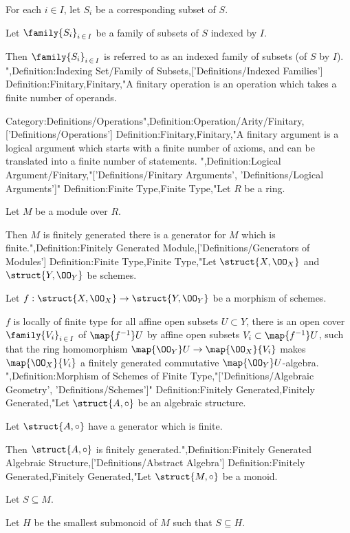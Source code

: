 For each $i \in I$, let $S_i$ be a corresponding subset of $S$.

Let $\family {S_i}_{i \mathop \in I}$ be a family of subsets of $S$ indexed by $I$.


Then $\family {S_i}_{i \mathop \in I}$ is referred to as an indexed family of subsets (of $S$ by $I$).
",Definition:Indexing Set/Family of Subsets,['Definitions/Indexed Families']
Definition:Finitary,Finitary,"A finitary operation is an operation which takes a finite number of operands.


Category:Definitions/Operations",Definition:Operation/Arity/Finitary,['Definitions/Operations']
Definition:Finitary,Finitary,"A finitary argument is a logical argument which starts with a finite number of axioms, and can be translated into a finite number of statements.
",Definition:Logical Argument/Finitary,"['Definitions/Finitary Arguments', 'Definitions/Logical Arguments']"
Definition:Finite Type,Finite Type,"Let $R$ be a ring.

Let $M$ be a module over $R$.


Then $M$ is finitely generated  there is a generator for $M$ which is finite.",Definition:Finitely Generated Module,['Definitions/Generators of Modules']
Definition:Finite Type,Finite Type,"Let $\struct {X, \OO_X}$ and $\struct {Y, \OO_Y}$ be schemes.

Let $f : \struct {X, \OO_X} \to \struct {Y, \OO_Y}$ be a morphism of schemes.


$f$ is locally of finite type  for all affine open subsets $U \subset Y$, there is an open cover $\family {V_i}_{i \mathop \in I}$ of $\map {f^{-1} } U$ by affine open subsets $V_i \subset \map {f^{-1} } U$, such that the ring homomorphism $\map {\OO_Y} U \to \map {\OO_X} {V_i}$ makes $\map {\OO_X} {V_i}$ a finitely generated commutative $\map {\OO_Y} U$-algebra.
",Definition:Morphism of Schemes of Finite Type,"['Definitions/Algebraic Geometry', 'Definitions/Schemes']"
Definition:Finitely Generated,Finitely Generated,"Let $\struct {A, \circ}$ be an algebraic structure.

Let $\struct {A, \circ}$ have a generator which is finite.


Then $\struct {A, \circ}$ is finitely generated.",Definition:Finitely Generated Algebraic Structure,['Definitions/Abstract Algebra']
Definition:Finitely Generated,Finitely Generated,"Let $\struct {M, \circ}$ be a monoid.

Let $S \subseteq M$.

Let $H$ be the smallest submonoid of $M$ such that $S \subseteq H$.


